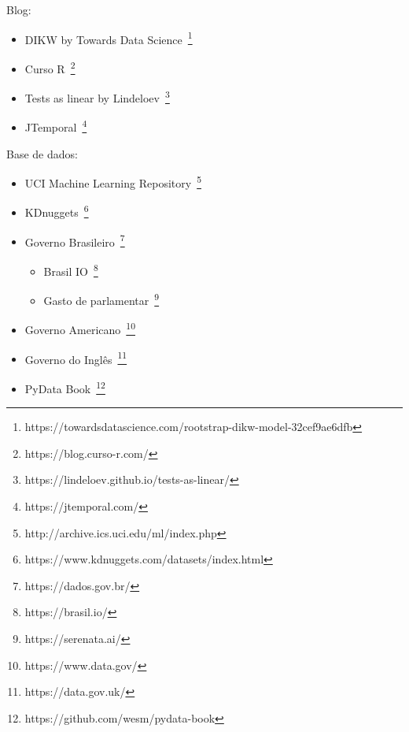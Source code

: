 Blog:
\begin{itemize}
	\item DIKW by Towards Data Science~\footnote{https://towardsdatascience.com/rootstrap-dikw-model-32cef9ae6dfb}
	\item Curso R~\footnote{https://blog.curso-r.com/}
	\item Tests as linear by Lindeloev~\footnote{https://lindeloev.github.io/tests-as-linear/}
	\item JTemporal~\footnote{https://jtemporal.com/}
\end{itemize}


Base de dados:
\begin{itemize}
	\item UCI Machine Learning Repository~\footnote{http://archive.ics.uci.edu/ml/index.php}
	\item KDnuggets~\footnote{https://www.kdnuggets.com/datasets/index.html}
	\item Governo Brasileiro~\footnote{https://dados.gov.br/}
	      \begin{itemize}
		      \item Brasil IO~\footnote{https://brasil.io/}
		      \item Gasto de parlamentar~\footnote{https://serenata.ai/}
	      \end{itemize}
	\item Governo Americano~\footnote{https://www.data.gov/}
	\item Governo do Inglês~\footnote{https://data.gov.uk/}
	\item PyData Book~\footnote{https://github.com/wesm/pydata-book}
\end{itemize}
